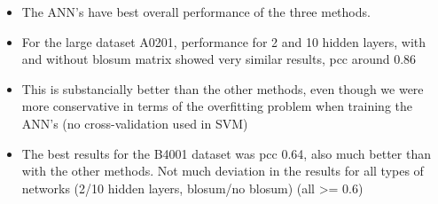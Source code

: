 \documentclass[presentation]{beamer}   %
\begin{document}
\begin{frame}
\begin{itemize}
\item<1> The ANN's have best overall performance of the three methods.
\item<2> For the large dataset A0201, performance for 2 and 10 hidden layers, with and without blosum matrix showed very similar results, pcc around 0.86
\item<3> This is substancially better than the other methods, even though we were more conservative in terms of the overfitting problem when training the ANN's (no cross-validation used in SVM)
\item<4> The best results for the B4001 dataset was pcc 0.64, also much better than with the other methods. Not much deviation in the results for all types of networks (2/10 hidden layers, blosum/no blosum) (all >= 0.6)
\end{itemize}
\end{frame}
\end{document}
